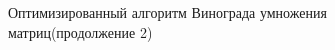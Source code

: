 \documentclass[a4paper,12pt]{report}
\begin{document}
\begin{figure}[ht!]
\caption{Оптимизированный алгоритм Винограда умножения матриц(продолжение 2)}
\end{figure}

\newpage
\end{document}
